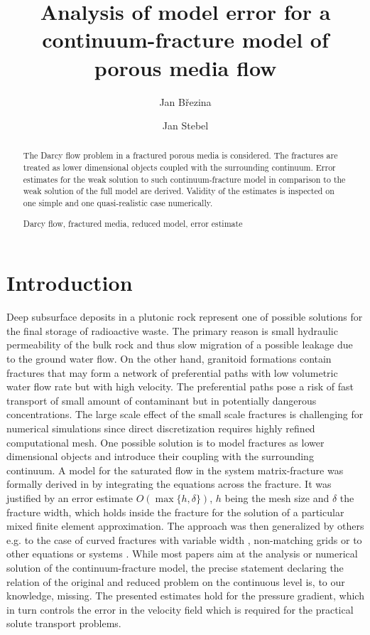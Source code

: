 \documentclass{llncs}
\newcommand{\keywords}[1]{\par\addvspace\baselineskip
\noindent\keywordname\enspace\ignorespaces#1}
\begin{document}
\title{Analysis of model error for a continuum-fracture model of porous media flow}
\author{Jan B\v rezina \and Jan Stebel}

\maketitle

\begin{abstract}
The Darcy flow problem in a fractured porous media is considered. The fractures are treated as
lower dimensional objects coupled with the surrounding continuum. Error estimates for the weak solution 
to such continuum-fracture model in comparison to the weak solution of the full model are derived.
Validity of the estimates is inspected on one simple and one quasi-realistic case numerically.
\keywords{Darcy flow, fractured media, reduced model, error estimate}
\end{abstract}

\section{Introduction}


Deep subsurface deposits in a plutonic rock represent one of possible solutions for the final storage of radioactive waste. The primary reason is 
small hydraulic permeability of the bulk rock and thus slow migration of a possible leakage due to the ground water flow.  On the other hand, 
granitoid formations contain fractures that may form a network of preferential paths with low volumetric water flow rate but with 
high velocity. The preferential paths pose a risk of fast transport of small amount of contaminant but in potentially dangerous concentrations.
The large scale effect of the small scale fractures is challenging for numerical simulations since direct discretization requires highly refined
computational mesh. One possible solution is to model fractures as lower dimensional objects and introduce their coupling with the surrounding continuum.
A model for the saturated flow in the system matrix-fracture was formally derived in \cite{martin_modeling_2005} by integrating the equations across the fracture.
It was justified by an error estimate $O(\max\{h,\delta\})$, $h$ being the mesh size and $\delta$ the fracture width, which holds inside the fracture for the solution of a particular mixed finite element approximation.
The approach was then generalized by others e.g. to the case of curved fractures with variable width \cite{angot_asymptotic_2009}, non-matching grids \cite{frih_modeling_2012} or to other equations or systems \cite{lesinigo_multiscale_2011,fumagalli_reduced_2013,ganis_modeling_2014}.
While most papers aim at the analysis or numerical solution of the continuum-fracture model, the precise statement declaring the relation of the original and reduced problem on the continuous level is, to our knowledge, missing.
The presented estimates hold for the pressure gradient, which in turn controls the error in the velocity field which is required for the  
practical solute transport problems.
\end{document}

